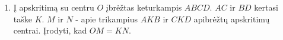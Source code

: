 \begin{enumerate}
\item Į apskritimą su centru $O$ įbrėžtas keturkampis
  $ABCD$. $AC$ ir $BD$ kertasi taške $K$. $M$ ir $N$ - apie
  trikampius $AKB$ ir $CKD$ apibrėžtų apskritimų centrai.
  Įrodyti, kad $OM = KN$.

\end{enumerate}
